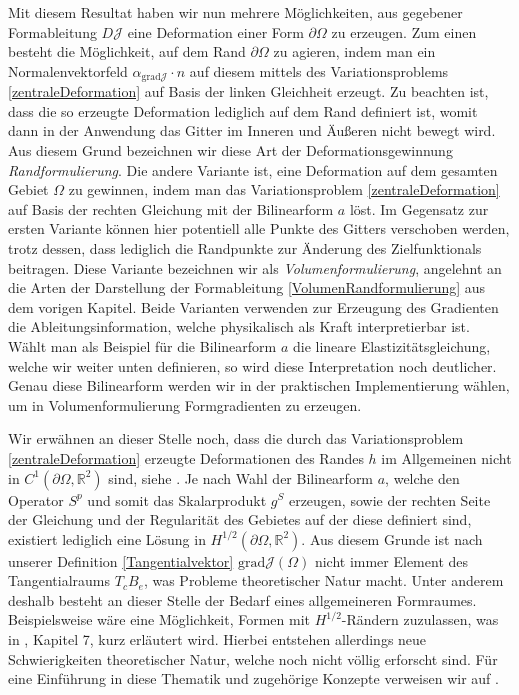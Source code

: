Mit diesem Resultat haben wir nun mehrere Möglichkeiten, aus gegebener Formableitung $D\mathcal{J}$ eine Deformation einer Form $\partial\Omega$ zu erzeugen. Zum einen besteht die Möglichkeit, auf dem Rand $\partial\Omega$ zu agieren, indem man ein Normalenvektorfeld $\alpha_{\text{grad}\mathcal{J}} \cdot n$ auf diesem mittels des Variationsproblems \ref{zentraleDeformation} auf Basis der linken Gleichheit erzeugt. Zu beachten ist, dass die so erzeugte Deformation lediglich auf dem Rand definiert ist, womit dann in der Anwendung das Gitter im Inneren und Äußeren nicht bewegt wird. Aus diesem Grund bezeichnen wir diese Art der Deformationsgewinnung \textit{Randformulierung}. Die andere Variante ist, eine Deformation auf dem gesamten Gebiet $\Omega$ zu gewinnen, indem man das Variationsproblem \ref{zentraleDeformation} auf Basis der rechten Gleichung mit der Bilinearform 
$a$ löst. Im Gegensatz zur ersten Variante können hier potentiell alle Punkte des Gitters verschoben werden, trotz dessen, dass lediglich die Randpunkte zur Änderung des Zielfunktionals beitragen. Diese Variante bezeichnen wir als \textit{Volumenformulierung}, angelehnt an die Arten der Darstellung der Formableitung \ref{VolumenRandformulierung} aus dem vorigen Kapitel. Beide Varianten verwenden zur Erzeugung des Gradienten die Ableitungsinformation, welche physikalisch als Kraft interpretierbar ist. Wählt man als Beispiel für die Bilinearform $a$ die lineare Elastizitätsgleichung, welche wir weiter unten definieren, so wird diese Interpretation noch deutlicher. Genau diese Bilinearform werden wir in der praktischen Implementierung wählen, um in Volumenformulierung Formgradienten zu erzeugen.

Wir erwähnen an dieser Stelle noch, dass die durch das Variationsproblem \ref{zentraleDeformation} erzeugte Deformationen des Randes $h$ im Allgemeinen nicht in $C^1(\partial\Omega,\mathbb{R}^2)$ sind, siehe \cite{bfgs2}. Je nach Wahl der Bilinearform $a$, welche den Operator $S^p$ und somit das Skalarprodukt $g^S$ erzeugen, sowie der rechten Seite der Gleichung und der Regularität des Gebietes auf der diese definiert sind, existiert lediglich eine Lösung in $H^{1/2}(\partial\Omega,\mathbb{R}^2)$. Aus diesem Grunde ist nach unserer Definition \ref{Tangentialvektor} $\text{grad}\mathcal{J}(\Omega)$ nicht immer Element des Tangentialraums $T_cB_e$, was Probleme theoretischer Natur macht. Unter anderem deshalb besteht an dieser Stelle der Bedarf eines allgemeineren Formraumes. Beispielsweise wäre eine Möglichkeit, Formen mit $H^{1/2}$-Rändern zuzulassen, was in \cite{shape_space}, Kapitel 7, kurz erläutert wird. Hierbei entstehen allerdings neue Schwierigkeiten theoretischer Natur, welche noch nicht völlig erforscht sind. Für eine Einführung in diese Thematik und zugehörige Konzepte verweisen wir auf \cite{diffeology}.

